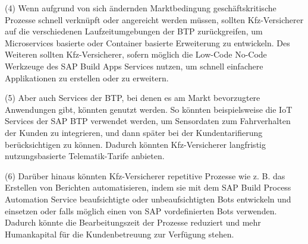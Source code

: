 (4) Wenn aufgrund von sich ändernden Marktbedingung geschäftskritische Prozesse schnell verknüpft oder angereicht werden müssen, sollten Kfz-Versicherer auf die verschiedenen Laufzeitumgebungen der BTP zurückgreifen, um Microservices basierte oder Container basierte Erweiterung zu entwickeln. Des Weiteren sollten Kfz-Versicherer, sofern möglich die Low-Code No-Code Werkzeuge des SAP Build Apps Services nutzen, um schnell einfachere Applikationen zu erstellen oder zu erweitern. 

(5) Aber auch Services der BTP, bei denen es am Markt bevorzugtere Anwendungen gibt, könnten genutzt werden. So könnten beispielsweise die IoT Services der SAP BTP verwendet werden, um Sensordaten zum Fahrverhalten der Kunden zu integrieren, und dann später bei der Kundentarifierung berücksichtigen zu können. Dadurch könnten Kfz-Versicherer langfristig nutzungsbasierte Telematik-Tarife anbieten.

(6) Darüber hinaus könnten Kfz-Versicherer repetitive Prozesse wie z. B. das Erstellen von Berichten automatisieren, indem sie mit dem SAP Build Process Automation Service beaufsichtigte oder unbeaufsichtigten Bots entwickeln und einsetzen oder falls möglich einen von SAP vordefinierten Bots verwenden. Dadurch könnte die Bearbeitungszeit der Prozesse reduziert und mehr Humankapital für die Kundenbetreuung zur Verfügung stehen.


